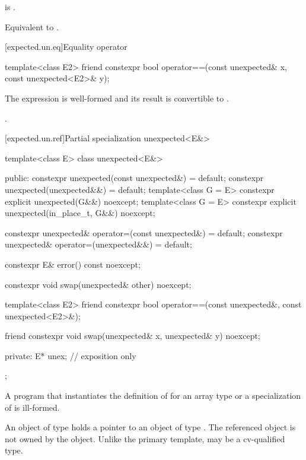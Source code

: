 \begin{itemdescr}
\pnum
\constraints
{} is .

\pnum
\effects
Equivalent to .
\end{itemdescr}

[expected.un.eq]{Equality operator}

%
\begin{itemdecl}
template<class E2>
friend constexpr bool operator==(const unexpected& x, const unexpected<E2>& y);
\end{itemdecl}

\begin{itemdescr}
\pnum
\mandates
The expression  is well-formed and its result is convertible to .

\pnum
\returns
{}.
\end{itemdescr}

[expected.un.ref]{Partial specialization unexpected<E&>}

\begin{codeblock}
template<class E>
class unexpected<E&> {
public:
  constexpr unexpected(const unexpected&) = default;
  constexpr unexpected(unexpected&&) = default;
  template<class G = E>
    constexpr explicit unexpected(G&&) noexcept;
  template<class G = E>
    constexpr explicit unexpected(in_place_t, G&&) noexcept;

  constexpr unexpected& operator=(const unexpected&) = default;
  constexpr unexpected& operator=(unexpected&&) = default;

  constexpr E& error() const noexcept;

  constexpr void swap(unexpected& other) noexcept;

  template<class E2>
    friend constexpr bool operator==(const unexpected&, const unexpected<E2>&);

  friend constexpr void swap(unexpected& x, unexpected& y) noexcept;

private:
  E* unex;              // exposition only
};
\end{codeblock}

\begin{itemdescr}
\pnum
\mandates
A program that instantiates the definition of  for an array type or a specialization of  is ill-formed.

\pnum
\remarks
An object of type  holds a pointer to an object of type . The referenced object is not owned by the  object. Unlike the primary template,  may be a cv-qualified type.
\end{itemdescr}

